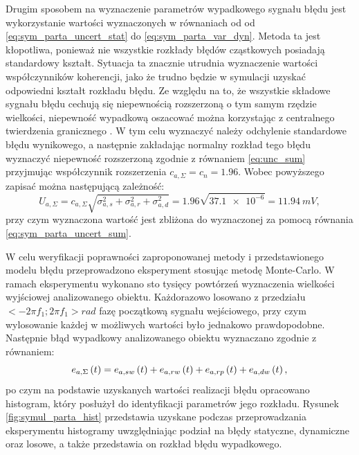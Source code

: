 Drugim sposobem na wyznaczenie parametrów wypadkowego sygnału błędu jest wykorzystanie wartości wyznaczonych w równaniach od od \eqref{eq:sym_parta_uncert_stat} do \eqref{eq:sym_parta_var_dyn}. Metoda ta jest kłopotliwa, ponieważ nie wszystkie rozkłady błędów cząstkowych posiadają standardowy kształt. Sytuacja ta znacznie utrudnia wyznaczenie wartości współczynników koherencji, jako że trudno będzie w symulacji uzyskać odpowiedni kształt rozkładu błędu. Ze względu na to, że wszystkie składowe sygnału błędu cechują się niepewnością rozszerzoną o tym samym rzędzie wielkości, niepewność wypadkową oszacować można korzystając z centralnego twierdzenia granicznego \cite{jcgm_guide}. W tym celu wyznaczyć należy odchylenie standardowe błędu wynikowego, a następnie zakładając normalny rozkład tego błędu wyznaczyć niepewność rozszerzoną zgodnie z równaniem \eqref{eq:unc_sum} przyjmując współczynnik rozszerzenia $c_{a,\Sigma} = c_{n} = 1.96$. Wobec powyższego zapisać można następującą zależność:
\begin{equation}
U_{a,\Sigma} = c_{a,\Sigma} \sqrt{\sigma_{a,s}^{2} + \sigma_{a,r}^{2} + \sigma_{a,d}^{2}} = 1.96 \sqrt{\num{37.1e-6}} = \qty{11.94}{mV} \label{eq:sym_parta_uncert_value_b},
\end{equation}
przy czym wyznaczona wartość jest zbliżona do wyznaczonej za pomocą równania \eqref{eq:sym_parta_uncert_sum}.

W celu weryfikacji poprawności zaproponowanej metody i przedstawionego modelu błędu przeprowadzono eksperyment stosując metodę Monte-Carlo. W ramach eksperymentu wykonano sto tysięcy powtórzeń wyznaczenia wielkości wyjściowej analizowanego obiektu. Każdorazowo losowano z przedziału $<-2 \pi f_{1};2 \pi f_{1}>\unit{rad}$ fazę początkową sygnału wejściowego, przy czym wylosowanie każdej w możliwych wartości było jednakowo prawdopodobne. Następnie błąd wypadkowy analizowanego obiektu wyznaczano zgodnie z równaniem:
\begin{equation}
e_{a,\Sigma} \left(t\right) = e_{a,sw} \left(t\right) + e_{a,rw} \left(t\right) + e_{a,rp} \left(t\right) + e_{a,dw} \left(t\right) \label{eq:sym_parta_error_sum},
\end{equation}
po czym na podstawie uzyskanych wartości realizacji błędu opracowano histogram, który posłużył do identyfikacji parametrów jego rozkładu. Rysunek \ref{fig:symul_parta_hist} przedstawia uzyskane podczas przeprowadzania eksperymentu histogramy uwzględniając podział na błędy statyczne, dynamiczne oraz losowe, a także przedstawia on rozkład błędu wypadkowego.

